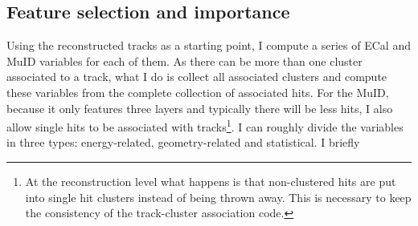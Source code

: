 \subsection{Feature selection and importance}

Using the reconstructed tracks as a starting point, I compute a series of ECal and MuID variables for each of them. As there can be more than one cluster associated to a track, what I do is collect all associated clusters and compute these variables from the complete collection of associated hits. For the MuID, because it only features three layers and typically there will be less hits, I also allow single hits to be associated with tracks\footnote{At the reconstruction level what happens is that non-clustered hits are put into single hit clusters instead of being thrown away. This is necessary to keep the consistency of the track-cluster association code.}. I can roughly divide the variables in three types: energy-related, geometry-related and statistical. I briefly 


